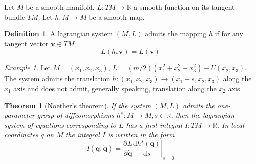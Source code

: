 \documentclass[conference]{IEEEtran}
\newtheorem{theorem}{Theorem}[section]
\theoremstyle{definition}
\newtheorem{definition}{Definition}[section]
\theoremstyle{remark}
\newtheorem{exmp}{Example}
\begin{document}
    Let $M$ be a smooth manifold, $L: TM \to \mathbb{R}$ a smooth function on its tangent bundle $TM$. Let $h: M \to M$ be a smooth map.

    \begin{definition}
        A lagrangian system $(M, L)$ admits the mapping $h$ if for any tangent vector $\mathbf{v} \in TM$
        \begin{equation*}
            L(h_* \mathbf{v}) = L(\mathbf{v})
        \end{equation*}
    \end{definition}

    \begin{exmp}
        Let $M = {(x_1, x_2, x_3)}$, $L = (m/2) (\dot{x}_1^2 + \dot{x}_2^2 + \dot{x}_3^2) - U(x_2, x_3)$. The system admits the translation $h: (x_1, x_2, x_3) \to (x_1 + s, x_2, x_3)$ along the $x_1$ axis and does not admit, generally speaking, translation along the $x_2$ axis.
    \end{exmp}

    \begin{theorem}[Noether's theorem]
        If the system $(M, L)$ admits the one-parameter group of diffeomorphisms $h^s: M \to M, s \in \mathbb{R}$, then the lagrangian system of equations corresponding to $L$ has a first integral $I: TM \to \mathbb{R}$. In local coordinates $q$ on $M$ the integral $I$ is written in the form
        \begin{equation*}
            I(\mathbf{q}, \dot{\mathbf{q}}) = \dfrac{\partial L}{\partial \dot{\mathbf{q}}} \left. \dfrac{\mathrm{d} h^s(\mathbf{q})}{\mathrm{d} s} \right|_{s = 0}
        \end{equation*}
    \end{theorem}
\end{document}
